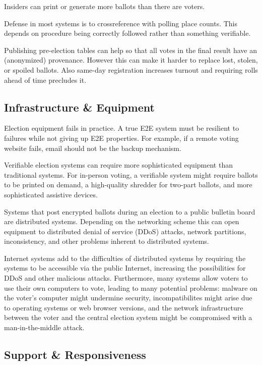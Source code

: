 
Insiders can print or generate more ballots than there are voters.

Defense in most systems is to crossreference with polling place
counts. This depends on procedure being correctly followed rather than
something verifiable.

Publishing pre-election tables can help so that all votes in the final
result have an (anonymized) provenance. However this can make it
harder to replace lost, stolen, or spoiled ballots. Also same-day
registration increases turnout and requiring rolls ahead of time
precludes it.

\subsection{Infrastructure \& Equipment}


Election equipment fails in practice. A true E2E system must be
resilient to failures while not giving up E2E properties. For example,
if a remote voting website fails, email should not be the backup
mechanism.

Verifiable election systems can require more sophisticated equipment
than traditional systems. For in-person voting, a verifiable system
might require ballots to be printed on demand, a high-quality shredder
for two-part ballots, and more sophisticated assistive devices.

Systems that post encrypted ballots during an election to a public
bulletin board are distributed systems. Depending on the networking
scheme this can open equipment to distributed denial of service (DDoS)
attacks, network partitions, inconsistency, and other problems
inherent to distributed systems.

Internet systems add to the difficulties of distributed systems by
requiring the systems to be accessible via the public Internet,
increasing the possibilities for DDoS and other malicious
attacks. Furthermore, many systems allow voters to use their own
computers to vote, leading to many potential problems: malware on the
voter's computer might undermine security, incompatibilites might
arise due to operating systems or web browser versions, and the
network infrastructure between the voter and the central election
system might be compromised with a man-in-the-middle attack.

\subsection{Support \& Responsiveness}


